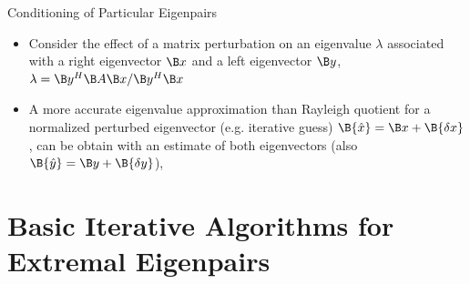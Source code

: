 \begin{frame}{Conditioning of Particular Eigenpairs}

\begin{itemize}
\item Consider the effect of a matrix perturbation on an eigenvalue $\lambda$ associated with a right eigenvector $\B x$ and a left eigenvector $\B y$, $\lambda = \B y^H \B A \B x / \B y^H \B x$


\item A more accurate eigenvalue approximation than Rayleigh quotient 
      for a normalized perturbed eigenvector (e.g. iterative guess) $\B{\hat{x}} = \B x+\B{\delta x}$,
      can be obtain with an estimate of both eigenvectors (also  $\B{\hat{y}} = \B y+\B{\delta y}$),

\end{itemize}

\end{frame}

\section{Basic Iterative Algorithms for Extremal Eigenpairs}

